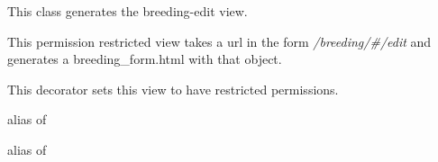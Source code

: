 \documentclass[letterpaper,10pt,english]{sphinxmanual}
\begin{document}

\begin{fulllineitems}
\label{animals:mousedb.animal.views.BreedingUpdate}
This class generates the breeding-edit view.

This permission restricted view takes a url in the form \emph{/breeding/\#/edit} and generates a breeding\_form.html with that object.

\begin{fulllineitems}
\label{animals:mousedb.animal.views.BreedingUpdate.dispatch}
This decorator sets this view to have restricted permissions.

\end{fulllineitems}


\begin{fulllineitems}
\label{animals:mousedb.animal.views.BreedingUpdate.form_class}
alias of 

\end{fulllineitems}


\begin{fulllineitems}
\label{animals:mousedb.animal.views.BreedingUpdate.model}
alias of 

\end{fulllineitems}


\end{fulllineitems}

\end{document}

